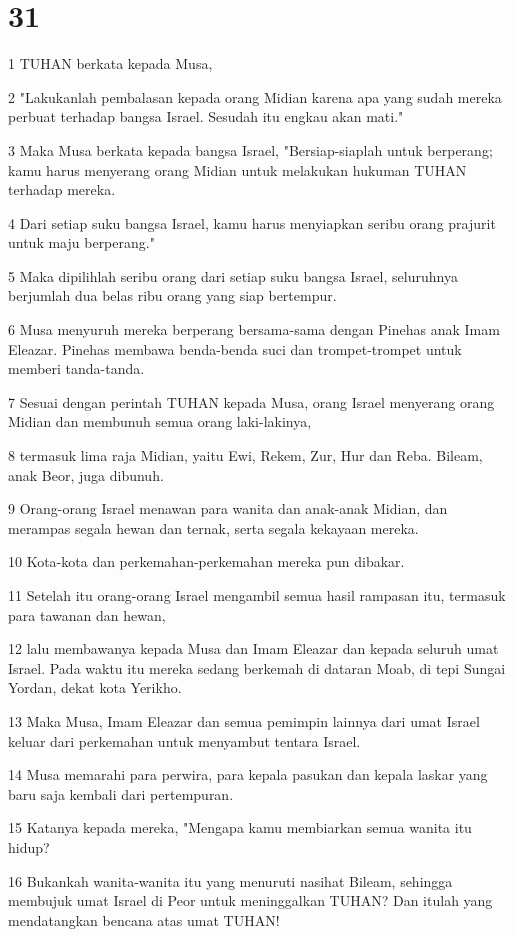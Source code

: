 \chapter{31}

\par 1 TUHAN berkata kepada Musa,
\par 2 "Lakukanlah pembalasan kepada orang Midian karena apa yang sudah mereka perbuat terhadap bangsa Israel. Sesudah itu engkau akan mati."
\par 3 Maka Musa berkata kepada bangsa Israel, "Bersiap-siaplah untuk berperang; kamu harus menyerang orang Midian untuk melakukan hukuman TUHAN terhadap mereka.
\par 4 Dari setiap suku bangsa Israel, kamu harus menyiapkan seribu orang prajurit untuk maju berperang."
\par 5 Maka dipilihlah seribu orang dari setiap suku bangsa Israel, seluruhnya berjumlah dua belas ribu orang yang siap bertempur.
\par 6 Musa menyuruh mereka berperang bersama-sama dengan Pinehas anak Imam Eleazar. Pinehas membawa benda-benda suci dan trompet-trompet untuk memberi tanda-tanda.
\par 7 Sesuai dengan perintah TUHAN kepada Musa, orang Israel menyerang orang Midian dan membunuh semua orang laki-lakinya,
\par 8 termasuk lima raja Midian, yaitu Ewi, Rekem, Zur, Hur dan Reba. Bileam, anak Beor, juga dibunuh.
\par 9 Orang-orang Israel menawan para wanita dan anak-anak Midian, dan merampas segala hewan dan ternak, serta segala kekayaan mereka.
\par 10 Kota-kota dan perkemahan-perkemahan mereka pun dibakar.
\par 11 Setelah itu orang-orang Israel mengambil semua hasil rampasan itu, termasuk para tawanan dan hewan,
\par 12 lalu membawanya kepada Musa dan Imam Eleazar dan kepada seluruh umat Israel. Pada waktu itu mereka sedang berkemah di dataran Moab, di tepi Sungai Yordan, dekat kota Yerikho.
\par 13 Maka Musa, Imam Eleazar dan semua pemimpin lainnya dari umat Israel keluar dari perkemahan untuk menyambut tentara Israel.
\par 14 Musa memarahi para perwira, para kepala pasukan dan kepala laskar yang baru saja kembali dari pertempuran.
\par 15 Katanya kepada mereka, "Mengapa kamu membiarkan semua wanita itu hidup?
\par 16 Bukankah wanita-wanita itu yang menuruti nasihat Bileam, sehingga membujuk umat Israel di Peor untuk meninggalkan TUHAN? Dan itulah yang mendatangkan bencana atas umat TUHAN!
